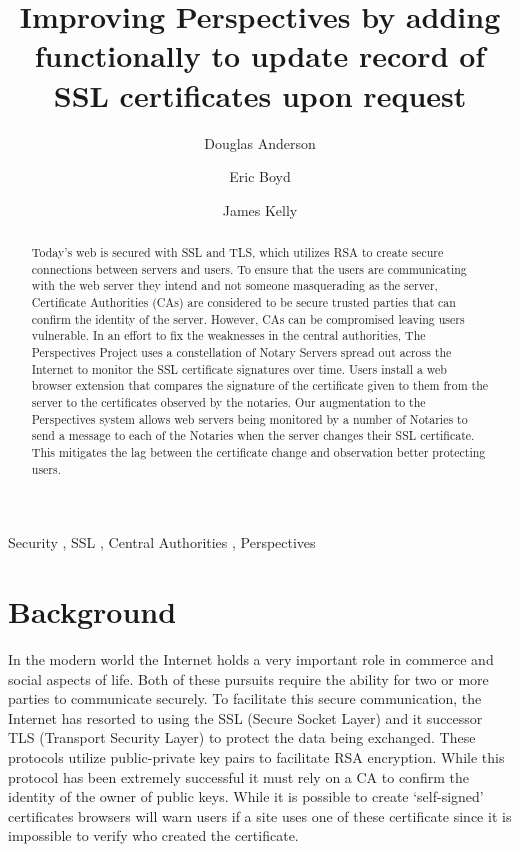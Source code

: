 \documentclass[preprint,review,12pt]{elsarticle}
\begin{document}
\begin{frontmatter}

\title{Improving Perspectives by adding functionally to update record of SSL certificates upon request}

\author[doug]{Douglas Anderson}
\author[eric]{Eric Boyd}
\author[james]{James Kelly}
\address[doug]{dander01@uoguelph.ca}
\address[eric]{boyde@uoguelph.ca}
\address[james]{kellyj@uoguelph.ca}


\begin{abstract}

Today's web is secured with SSL and TLS, which utilizes RSA to create secure
connections between servers and users. To ensure that the users are
communicating with the web server they intend and not someone masquerading as
the server, Certificate Authorities (CAs) are considered to be secure trusted
parties that can confirm the identity of the server. However, CAs
 can be compromised leaving users vulnerable. In an effort to fix the
weaknesses in the central authorities, The Perspectives Project uses a
constellation of Notary Servers spread out across the Internet to monitor the
SSL certificate signatures over time. Users install a web browser extension that
compares the signature of the certificate given to them from the server to the
certificates observed by the notaries. Our augmentation to the Perspectives
system allows web servers being monitored by a number of Notaries to send a
message to each of the Notaries when the server changes their SSL certificate.
This mitigates the lag between the certificate change and observation better
protecting users.

\end{abstract}

\begin{keyword}
Security \sep
SSL \sep
Central Authorities \sep
Perspectives
\end{keyword}

\end{frontmatter}

\section{Background}
\label{background}

In the modern world the Internet holds a very important role in commerce and
social aspects of life. Both of these pursuits require the ability for two or
more parties to communicate securely. To facilitate this secure communication,
the Internet has resorted to using the SSL (Secure Socket Layer) and it
successor TLS (Transport Security Layer) to protect the data being exchanged.
These protocols utilize public-private key pairs to facilitate RSA encryption.
While this protocol has been extremely successful it must rely on a CA to
confirm the identity of the owner of public keys. While it is possible to
create `self-signed' certificates browsers will warn users if a site uses one
of these certificate since it is impossible to verify who created the
certificate. 
\end{document}
